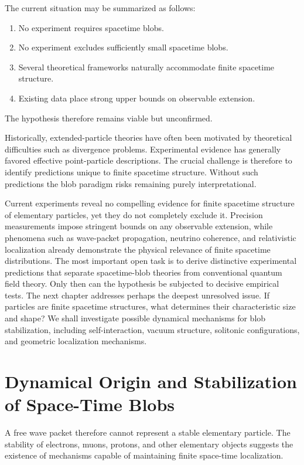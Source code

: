 The current situation may be summarized as follows:
\begin{enumerate}
\item No experiment requires spacetime blobs.
\item No experiment excludes sufficiently small spacetime blobs.
\item Several theoretical frameworks naturally accommodate finite spacetime structure.
\item Existing data place strong upper bounds on observable extension.
\end{enumerate}
The hypothesis therefore remains viable but unconfirmed.

Historically, extended-particle theories have often been motivated by
theoretical difficulties such as divergence problems.
Experimental evidence has generally favored effective point-particle
descriptions.
The crucial challenge is therefore to identify predictions unique to finite
spacetime structure.
Without such predictions the blob paradigm risks remaining purely interpretational.

Current experiments reveal no compelling evidence for finite spacetime
structure of elementary particles, yet they do not completely exclude it.
Precision measurements impose stringent bounds on any observable extension,
while phenomena such as wave-packet propagation, neutrino coherence, and
relativistic localization already demonstrate the physical relevance of
finite spacetime distributions.
The most important open task is to derive distinctive experimental
predictions that separate spacetime-blob theories from conventional quantum
field theory. Only then can the hypothesis be subjected to decisive
empirical tests.
The next chapter addresses perhaps the deepest unresolved issue. 
If particles are finite spacetime structures, what determines their
characteristic size and shape? We shall investigate possible dynamical
mechanisms for blob stabilization, including self-interaction, vacuum
structure, solitonic configurations, and geometric localization mechanisms.

\section{Dynamical Origin and Stabilization of Space-Time Blobs}
A free wave packet therefore cannot represent a stable elementary particle.
The stability of electrons, muons, protons, and other elementary objects
suggests the existence of mechanisms capable of maintaining finite
space-time localization.
